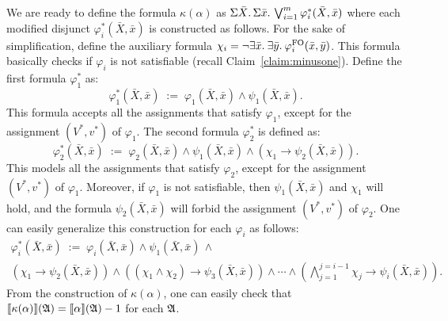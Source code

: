 We are ready to define the formula  $\kappa(\alpha)$ as $\Sigma{\bar{X}}.\,\Sigma{\bar{x}}.\, \bigvee_{i = 1}^m\varphi_i^*(\bar{X},\bar{x})$
where each modified disjunct $\varphi_i^*(\bar{X},\bar{x})$ is constructed as follows. 
For the sake of simplification, define the auxiliary formula $\chi_i = \neg \exists{\bar{x}}.\: \exists{\bar{y}}.\:\varphi^{{\rm FO}}_i(\bar{x},\bar{y})$. 
This formula basically checks if $\varphi_i$ is not satisfiable (recall Claim~\ref{claim:minusone}).
Define the first formula $\varphi_1^*$ as:
\[
\varphi^*_1(\bar{X},\bar{x}) \; := \; \varphi_1(\bar{X},\bar{x})\wedge\psi_1(\bar{X},\bar{x}).
\]
This formula accepts all the assignments that satisfy $\varphi_1$, except for the assignment $(V^*,v^*)$ of $\varphi_1$. The second formula $\varphi_2^*$ is defined as:
\[
\varphi^*_2(\bar{X},\bar{x}) \; := \; \varphi_2(\bar{X},\bar{x})\wedge\psi_1(\bar{X},\bar{x})\wedge(\chi_1\to\psi_2(\bar{X},\bar{x})).
\]
This models all the assignments that satisfy $\varphi_2$, except for the assignment $(V^*,v^*)$ of $\varphi_1$. Moreover, if $\varphi_1$ is not satisfiable, then $\psi_1(\bar{X},\bar{x})$ and $\chi_1$ will hold, and the formula $\psi_2(\bar{X},\bar{x})$ will forbid the assignment $(V^*,v^*)$ of $\varphi_2$. 
One can easily generalize this construction for each $\varphi_i$ as follows:
\begin{multline*}
\varphi_i^*(\bar{X},\bar{x}) \; := \; \varphi_i(\bar{X},\bar{x})\wedge\psi_1(\bar{X},\bar{x})\,\wedge \\ (\chi_1\to\psi_2(\bar{X},\bar{x}))\wedge((\chi_1\wedge\chi_2)\to\psi_3(\bar{X},\bar{x}))\wedge\cdots\wedge(
\bigwedge_{j = 1}^{j = i-1}\chi_j\to\psi_i(\bar{X},\bar{x})).
\end{multline*}
From the construction of $\kappa(\alpha)$, one can easily check that  ${\llbracket{}{\kappa(\alpha)}\rrbracket}(\mathfrak{A}) = {\llbracket{}{\alpha}\rrbracket}(\mathfrak{A})-1$ for each $\mathfrak{A}$.

\medskip

